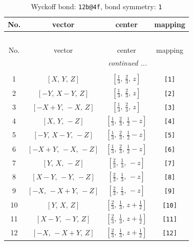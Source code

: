 \documentclass[fleqn,8pt]{jsarticle}
\begin{document}
\begin{longtable}{cccc}
\caption{Wyckoff bond: {\tt 12b@4f}, bond symmetry: {\tt 1}}
 \\
 \hline \hline
No. & vector & center & mapping \\ \hline \endfirsthead

\multicolumn{3}{l}{\tablename\ \thetable{}} \\
 \hline \hline
No. & vector & center & mapping \\ \hline \endhead

 \hline \hline
\multicolumn{3}{r}{\footnotesize\it continued ...} \\ \endfoot

 \hline \hline
\multicolumn{3}{r}{} \\ \endlastfoot

1 & $\left[ X,\, Y,\, Z \right]$ & $\left[ \frac{1}{3},\, \frac{2}{3},\, z \right]$ & {\tt [1]} \\ \hline
2 & $\left[ - Y,\, X - Y,\, Z \right]$ & $\left[ \frac{1}{3},\, \frac{2}{3},\, z \right]$ & {\tt [2]} \\ \hline
3 & $\left[ - X + Y,\, - X,\, Z \right]$ & $\left[ \frac{1}{3},\, \frac{2}{3},\, z \right]$ & {\tt [3]} \\ \hline
4 & $\left[ X,\, Y,\, - Z \right]$ & $\left[ \frac{1}{3},\, \frac{2}{3},\, \frac{1}{2} - z \right]$ & {\tt [4]} \\ \hline
5 & $\left[ - Y,\, X - Y,\, - Z \right]$ & $\left[ \frac{1}{3},\, \frac{2}{3},\, \frac{1}{2} - z \right]$ & {\tt [5]} \\ \hline
6 & $\left[ - X + Y,\, - X,\, - Z \right]$ & $\left[ \frac{1}{3},\, \frac{2}{3},\, \frac{1}{2} - z \right]$ & {\tt [6]} \\ \hline
7 & $\left[ Y,\, X,\, - Z \right]$ & $\left[ \frac{2}{3},\, \frac{1}{3},\, - z \right]$ & {\tt [7]} \\ \hline
8 & $\left[ X - Y,\, - Y,\, - Z \right]$ & $\left[ \frac{2}{3},\, \frac{1}{3},\, - z \right]$ & {\tt [8]} \\ \hline
9 & $\left[ - X,\, - X + Y,\, - Z \right]$ & $\left[ \frac{2}{3},\, \frac{1}{3},\, - z \right]$ & {\tt [9]} \\ \hline
10 & $\left[ Y,\, X,\, Z \right]$ & $\left[ \frac{2}{3},\, \frac{1}{3},\, z + \frac{1}{2} \right]$ & {\tt [10]} \\ \hline
11 & $\left[ X - Y,\, - Y,\, Z \right]$ & $\left[ \frac{2}{3},\, \frac{1}{3},\, z + \frac{1}{2} \right]$ & {\tt [11]} \\ \hline
12 & $\left[ - X,\, - X + Y,\, Z \right]$ & $\left[ \frac{2}{3},\, \frac{1}{3},\, z + \frac{1}{2} \right]$ & {\tt [12]} \\
\end{longtable}
\end{document}
